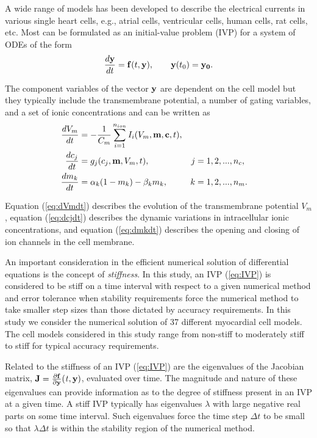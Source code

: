 \documentclass[landscape,a0b,final]{a0poster}
\newenvironment{poster}{
  \begin{center}
  \begin{minipage}[c]{0.98\textwidth}
}{
  \end{minipage} 
  \end{center}
}
\newenvironment{pcolumn}[1]{
  \begin{minipage}{#1\textwidth}
  \begin{center}
}{
  \end{center}
  \end{minipage}
}
\begin{document}
\begin{poster}
\begin{center}
\begin{pcolumn}{0.24}
{A wide range of models has been developed to describe the electrical
currents in various single heart cells, e.g., atrial cells,
ventricular cells, human cells, rat cells, etc. Most can be formulated
as an initial-value problem (IVP) for a system of ODEs of the form
\begin{equation}
\frac{d{\bf y}}{dt} = {\bf f}(t,{\bf y}), \qquad
 {\bf y}(t_0)=\bf{y_0}.
  \label{eq:IVP}
\end{equation}

The component variables of the vector ${\bf y}$ are dependent on the
cell model but they typically include the transmembrane potential, a
number of gating variables, and a set of ionic concentrations and
can be written as
\begin{subequations}
\label{eq:cellmodel}
\begin{align}
\label{eq:dVmdt}
\frac{dV_m}{dt}&=-\frac{1}{C_m} \sum\limits_{i=1}^{n_{ion}}
I_i(V_m,{\bf m},{\bf c},t),\\
\label{eq:dcjdt}
\frac{dc_j}{dt}&=g_j(c_j,{\bf m},V_m,t), &j&=1,2,...,n_c,\\
\label{eq:dmkdt}
\frac{dm_k}{dt}&= \alpha_k (1 -m_k)-\beta_k m_k, &k&=1,2,...,n_m.
\end{align}
\end{subequations}

Equation (\ref{eq:dVmdt}) describes the evolution of the transmembrane
potential $V_m$, equation (\ref{eq:dcjdt}) describes
the dynamic variations in intracellular ionic
concentrations, and equation (\ref{eq:dmkdt}) describes the opening and
closing of ion channels in the cell membrane. 

An important consideration in the efficient numerical solution of
differential equations is the concept of {\em stiffness}. In this study, 
an IVP (\ref{eq:IVP}) is considered to be stiff on a time interval with 
respect to a given numerical method and error tolerance when stability 
requirements force the numerical method to take smaller step sizes than 
those dictated by accuracy requirements.  In this study we consider the 
numerical solution of 37 different myocardial cell models. 
The cell models considered in this study range from non-stiff to
moderately stiff to stiff for typical accuracy requirements.

Related to the stiffness of an IVP (\ref{eq:IVP}) are the
eigenvalues of the Jacobian matrix, $\bf{J}=\frac{\partial {\bf
 f}}{\partial y} (\it{t},{\bf y})$, evaluated over time. The
magnitude and nature of these eigenvalues can provide information as to the degree
of stiffness present in an IVP at a given time. A stiff IVP typically
has eigenvalues $\lambda$ with large negative real parts on some time
interval. Such eigenvalues force the time step $\Delta t$ to be small
so that $\lambda\Delta t$ is within the stability region of the
numerical method. 



}
\end{pcolumn}
\end{center}
\end{poster}
\end{document}

